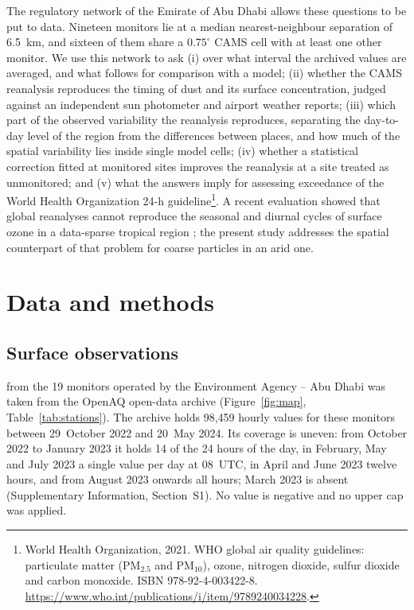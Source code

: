 The regulatory network of the Emirate of Abu Dhabi allows these questions to be put to data.
Nineteen \pmten{} monitors lie at a median nearest-neighbour separation of 6.5~km, and sixteen of
them share a $0.75^{\circ}$ CAMS cell with at least one other monitor. We use this network to ask
(i) over what interval the archived values are averaged, and what follows for comparison with a
model; (ii) whether the CAMS reanalysis reproduces the timing of dust and its surface
concentration, judged against an independent sun photometer and airport weather reports;
(iii) which part of the observed variability the reanalysis reproduces, separating the
day-to-day level of the region from the differences between places, and how much of the spatial
variability lies inside single model cells; (iv) whether a statistical correction fitted at
monitored sites improves the reanalysis at a site treated as unmonitored; and (v) what the
answers imply for assessing exceedance of the World Health Organization 24-h guideline\footnote{World Health Organization, 2021. WHO global air quality guidelines: particulate matter (PM$_{2.5}$ and PM$_{10}$), ozone, nitrogen dioxide, sulfur dioxide and carbon monoxide. ISBN 978-92-4-003422-8. \url{https://www.who.int/publications/i/item/9789240034228}.}. A recent evaluation showed
that global reanalyses cannot reproduce the seasonal and diurnal cycles of surface ozone in a
data-sparse tropical region \citep{vieira2023}; the present study addresses the spatial
counterpart of that problem for coarse particles in an arid one.

\section{Data and methods}

\subsection{Surface observations}
\label{sec:obs}

\pmten{} from the 19 monitors operated by the Environment Agency -- Abu Dhabi was taken from the
OpenAQ open-data archive \citep{rosales2025} (Figure~\ref{fig:map}, Table~\ref{tab:stations}).
The archive holds 98,459 hourly \pmten{} values for these monitors between 29~October 2022 and
20~May 2024. Its coverage is uneven: from October 2022 to January 2023 it holds 14 of the 24
hours of the day, in February, May and July 2023 a single value per day at 08~UTC, in April and
June 2023 twelve hours, and from August 2023 onwards all hours; March 2023 is absent
(Supplementary Information, Section~S1). No value is negative and no upper cap was applied.

